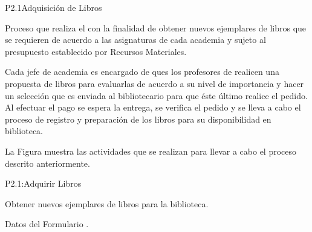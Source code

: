 
\begin{Proceso}{P2.1}{Adquisición de Libros} {
  

  Proceso que realiza el  con la finalidad de obtener nuevos ejemplares de libros que se requieren de acuerdo a las asignaturas de cada academia y sujeto al presupuesto establecido por Recursos Materiales. 
  
  Cada jefe de academia es encargado de ques los profesores de realicen una propuesta de libros para evaluarlas de acuerdo a su nivel de importancia y hacer un selección que es enviada al bibliotecario para que éste último realice el pedido. Al efectuar el pago se espera la entrega, se verifica el pedido y se lleva a cabo el proceso de registro y preparación de los libros para su disponibilidad en biblioteca.
  
  \newpage
  \noindent La Figura  muestra las actividades que se realizan para llevar a cabo el proceso descrito anteriormente.


} {P2.1:Adquirir Libros}

   { %
  }

   { %
    Obtener nuevos ejemplares de libros para la biblioteca.
  }

   { %
  	\begin{UClist}
  		\UCli Datos del Formulario . 
     	
    \end {UClist}
  }
  
   { %
  }


\end{Proceso}
